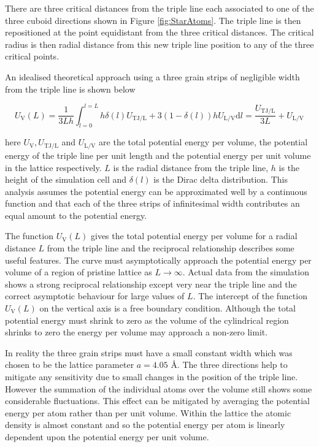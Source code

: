 \documentclass[12pt,a4paper,openany]{report}
\newcommand{\ts}[1]{\textrm{#1}}
\begin{document}
There are three critical distances from the triple line each associated to one of the three cuboid directions shown in Figure \ref{fig:StarAtoms}. The triple line is then repositioned at the point equidistant from the three critical distances. The critical radius is then radial distance from this new triple line position to any of the three critical points.       



An idealised theoretical approach using a three grain strips of negligible width from the triple line is shown below 

\[ U_{\ts{V}}(L) =\frac{1}{3 L h}\int_{l=0}^{l=L} h \delta(l) U_{\ts{TJ/L}} + 3(1-\delta(l) ) h U_{\ts{L/V}}  \text{d}l = \frac{U_{\ts{TJ/L}}}{3L}  + U_{\ts{L/V}} 
\label{eq:L1}
\]

here $U_{\ts{V}}, U_{\ts{TJ/L}}$ and  $U_{\ts{L/V}} $ are the total potential energy per volume, the potential energy of the triple line per unit length and the potential energy per unit volume in the lattice respectively. $L$ is the radial distance from the triple line, $h$ is the height of the simulation cell and $\delta(l)$ is the Dirac delta distribution. This analysis assumes the potential energy can be approximated well by a continuous function and that each of the three strips of infinitesimal width contributes an equal amount to the potential energy.

The function $U_{\ts{V}}(L)$ gives the total potential energy per volume for a radial distance $L$ from the triple line and the reciprocal relationship describes some useful features. The curve must asymptotically approach the potential energy per volume of a region of pristine lattice as $L \rightarrow \infty$. Actual data from the simulation shows a strong reciprocal relationship except very near the triple line and the correct asymptotic behaviour for large values of $L$. The intercept  of the function $U_{\ts{V}}(L)$ on the vertical axis is a free boundary condition. Although the total potential energy must shrink to zero as the volume of the cylindrical region shrinks to zero the energy per volume may approach a non-zero limit.  

In reality the three grain strips must have a small constant width which was chosen to be the lattice parameter $a =4.05 \textrm{ \AA}$. The three directions help to mitigate any sensitivity due to small changes in the position of the triple line. However the summation of the individual atoms over the volume still shows some considerable fluctuations. This effect can be mitigated by averaging the potential energy per atom rather than per unit volume. Within the lattice the atomic density is almost constant and so the potential energy per atom is linearly dependent upon the potential energy per unit volume. 
\end{document}
